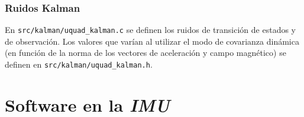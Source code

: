 \documentclass[main]{subfiles}
\begin{document}
\subsubsection{Ruidos Kalman}
\label{sec:software:config-kalman}

En \verb+src/kalman/uquad_kalman.c+ se definen los ruidos de transici\'on de estados y de observaci\'on. Los valores que var\'ian al utilizar el modo de covarianza din\'amica (en funci\'on de la norma de los vectores de aceleraci\'on y campo magn\'etico) se definen en \verb+src/kalman/uquad_kalman.h+.

\section{Software en la \textit{IMU}}
\label{sec:software:mongoose}
\end{document}
